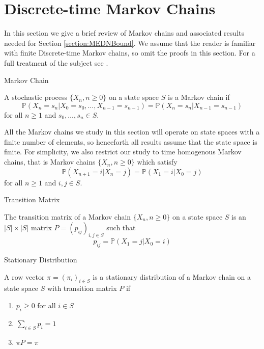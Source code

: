 \section{Discrete-time Markov Chains}

In this section we give a brief review of Markov chains and associated results needed for Section \ref{section:MEDNBound}. We assume that the reader is familiar with finite Discrete-time Markov chains, so omit the proofs in this section. For a full treatment of the subject see \cite{grimmetBook}.

\begin{definition}
	Markov Chain

	\noindent A stochastic process $\{X_n, n \geq 0 \}$ on a state space $S$ is a Markov chain if 
	$$
		\mathbb{P}(X_n = s_n | X_0 = s_0, \dots,  X_{n-1} = s_{n-1}) 
		= \mathbb{P}(X_n = s_n | X_{n-1} = s_{n-1})
	$$
	for all $n \geq 1$ and $s_0, \dots, s_n \in S$.
\end{definition}

All the Markov chains we study in this section will operate on state spaces with a finite number of elements, so henceforth all results assume that the state space is finite. For simplicity, we also restrict our study to time homogenous Markov chains, that is Markov chains $\{X_n, n \geq 0 \}$ which satisfy
$$
	\mathbb{P}(X_{n+1} = i | X_n = j)
	= \mathbb{P}(X_1 = i | X_0 = j)
$$
for all $n \geq 1$ and $i, j \in S$.

\begin{definition}
	Transition Matrix

	The transition matrix of a Markov chain $\{X_n, n \geq 0 \}$ on a state space $S$ is an $|S| \times |S|$ matrix $P=(p_{ij})_{i, j \in S}$ such that
	$$
		p_{ij} = \mathbb{P}(X_1 = j | X_0 = i)
	$$
\end{definition}

\begin{definition}
	Stationary Distribution

	\noindent
	A row vector $\pi=(\pi_i)_{i \in S}$ is a stationary distribution of a Markov chain on a state space $S$ with transition matrix $P$ if
	\begin{enumerate}
		\item $p_i \geq 0$ for all $i \in S$
		\item $\sum_{i \in S} p_i = 1$
		\item $\pi P = \pi$
	\end{enumerate}
\end{definition}

